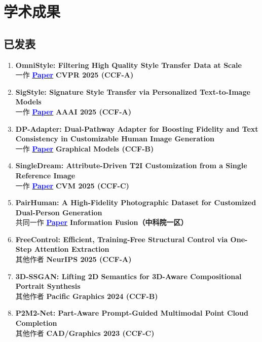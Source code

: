 \documentclass{resume}
\newcommand{\statusbadge}[2]{%
  \begingroup
  \setlength{\fboxsep}{1pt}%
  \colorbox{#1!10}{\textcolor{#1}{\footnotesize\textsf{#2}}}%
  \endgroup
}
\newcommand{\FirstAuthor}{\statusbadge{authorblue}{一作}}
\newcommand{\CoFirstAuthor}{\statusbadge{cofirstteal}{共同一作}}
\newcommand{\OtherAuthor}{\statusbadge{authorgray}{其他作者}}
\begin{document}
\section{\textbf{学术成果}}

\subsection*{{\textbf{已发表}}}
\begin{enumerate}
  \item \textbf{OmniStyle: Filtering High Quality Style Transfer Data at Scale}\\
  \FirstAuthor \quad \href{https://arxiv.org/pdf/2505.14028}{\textcolor{blue}{\textbf{Paper}}} \quad \textbf{CVPR 2025 (CCF-A)}

  \item \textbf{SigStyle: Signature Style Transfer via Personalized Text-to-Image Models}\\
  \FirstAuthor \quad \href{https://arxiv.org/pdf/2502.13997}{\textcolor{blue}{\textbf{Paper}}} \quad \textbf{AAAI 2025 (CCF-A)}

  \item \textbf{DP-Adapter: Dual-Pathway Adapter for Boosting Fidelity and Text Consistency in Customizable Human Image Generation}\\
  \FirstAuthor \quad \href{https://arxiv.org/abs/2502.13999}{\textcolor{blue}{\textbf{Paper}}} \quad \textbf{Graphical Models (CCF-B)}

  \item \textbf{SingleDream: Attribute-Driven T2I Customization from a Single Reference Image}\\
  \FirstAuthor \quad \href{https://dl.acm.org/doi/10.1007/978-981-96-5812-1_12}{\textcolor{blue}{\textbf{Paper}}} \quad \textbf{CVM 2025 (CCF-C)}

  \item \textbf{PairHuman: A High-Fidelity Photographic Dataset for Customized Dual-Person Generation}\\
  \CoFirstAuthor \quad \href{https://arxiv.org/pdf/2511.16712}{\textcolor{blue} {\textbf{Paper}}} \quad
  \textbf{Information Fusion（中科院一区）}

  \item \textbf{FreeControl: Efficient, Training-Free Structural Control via One-Step Attention Extraction}\\
  \OtherAuthor \quad \textbf{NeurIPS 2025 (CCF-A)}

  \item \textbf{3D-SSGAN: Lifting 2D Semantics for 3D-Aware Compositional Portrait Synthesis}\\
  \OtherAuthor \quad \textbf{Pacific Graphics 2024 (CCF-B)}

  \item \textbf{P2M2-Net: Part-Aware Prompt-Guided Multimodal Point Cloud Completion}\\
  \OtherAuthor \quad \textbf{CAD/Graphics 2023 (CCF-C)}
\end{enumerate}
\end{document}

